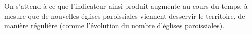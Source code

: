 On s'attend à ce que l'indicateur ainsi produit augmente au cours du temps, à mesure que de nouvelles églises paroissiales viennent desservir le territoire, de manière régulière (comme l'évolution du nombre d'églises paroissiales).


%
%


